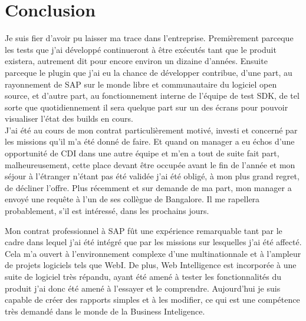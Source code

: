 \chapter*{Conclusion}



Je suis fier d'avoir pu laisser ma trace dans l'entreprise. Premièrement parceque les tests que j'ai développé continueront à être exécutés tant que le produit existera, autrement dit pour encore environ un dizaine d'années. Ensuite parceque le plugin que j'ai eu la chance de développer contribue, d'une part, au rayonnement de SAP sur le monde libre et communautaire du logiciel open source, et d'autre part, au fonctionnement interne de l'équipe de test SDK, de tel sorte que quotidiennement il sera quelque part sur un des écrans pour pouvoir visualiser l'état des builds en cours.\\

J'ai \'{e}t\'{e} au cours de mon contrat particulièrement motiv\'{e}, investi et concern\'{e} par les missions qu'il m'a été donné de faire. Et quand on manager a eu échos d'une opportunité de CDI dans une autre équipe et m'en a tout de suite fait part, malheureusement, cette place devant être occupée avant le fin de l'année et mon séjour à l'étranger n'étant pas été validée j'ai été obligé, à mon plus grand regret, de décliner l'offre. Plus récemment et sur demande de ma part, mon manager a envoyé une requête à l'un de ses collègue de Bangalore. Il me rapellera probablement, s'il est intéressé, dans les prochains jours.


Mon contrat professionnel à SAP fût une expérience remarquable tant par le cadre dans lequel j'ai été intégré que par les missions sur lesquelles j'ai été affecté. Cela m'a ouvert à l'environnement complexe d'une multinationnale et à l'ampleur de projets logiciels tels que WebI. De plus, Web Intelligence est incorporée à une suite de logiciel très répandu, ayant été amené à tester les fonctionnalités du produit j'ai donc été amené à l'essayer et le comprendre. Aujourd'hui je suis capable de créer des rapports simples et à les modifier, ce qui est une compétence très demandé dans le monde de la Business Inteligence.